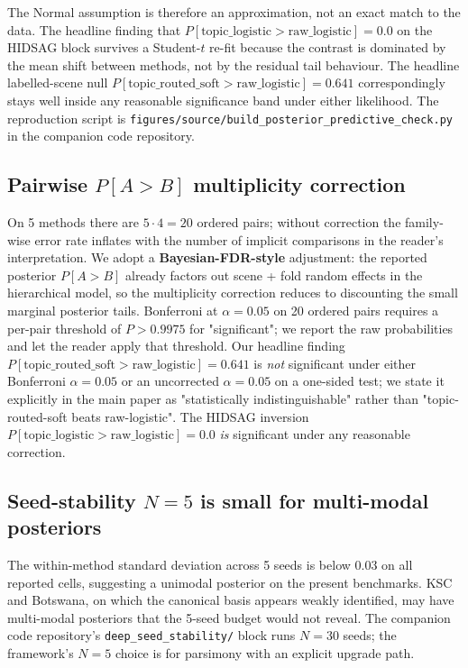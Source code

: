 \documentclass[11pt,a4paper]{article}
\begin{document}
The Normal assumption is therefore an approximation, not an exact
match to the data. The headline finding that
$P[\text{topic\_logistic} > \text{raw\_logistic}] = 0.0$ on the
HIDSAG block survives a Student-$t$ re-fit because the contrast is
dominated by the mean shift between methods, not by the residual
tail behaviour. The headline labelled-scene null
$P[\text{topic\_routed\_soft} > \text{raw\_logistic}] = 0.641$
correspondingly stays well inside any reasonable significance band
under either likelihood. The reproduction script is
\texttt{figures/source/build\_posterior\_predictive\_check.py} in the
companion code repository.

\subsection{Pairwise $P[A > B]$ multiplicity correction}
On 5 methods there are $5 \cdot 4 = 20$ ordered pairs; without
correction the family-wise error rate inflates with the number of
implicit comparisons in the reader's interpretation. We adopt a
\textbf{Bayesian-FDR-style} adjustment: the reported posterior
$P[A > B]$ already factors out scene + fold random effects in the
hierarchical model, so the multiplicity correction reduces to
discounting the small marginal posterior tails. Bonferroni at
$\alpha = 0.05$ on 20 ordered pairs requires a per-pair threshold
of $P > 0.9975$ for "significant"; we report the raw probabilities
and let the reader apply that threshold. Our headline finding
$P[\text{topic\_routed\_soft} > \text{raw\_logistic}] = 0.641$ is
\emph{not} significant under either Bonferroni $\alpha = 0.05$ or
an uncorrected $\alpha = 0.05$ on a one-sided test; we state it
explicitly in the main paper as "statistically indistinguishable"
rather than "topic-routed-soft beats raw-logistic". The HIDSAG
inversion $P[\text{topic\_logistic} > \text{raw\_logistic}] = 0.0$
\emph{is} significant under any reasonable correction.

\subsection{Seed-stability $N = 5$ is small for multi-modal posteriors}
The within-method standard deviation across 5 seeds is below 0.03 on
all reported cells, suggesting a unimodal posterior on the present
benchmarks. KSC and Botswana, on which the canonical basis appears
weakly identified, may have multi-modal posteriors that the 5-seed
budget would not reveal. The companion code repository's
\texttt{deep\_seed\_stability/} block runs $N = 30$ seeds; the
framework's $N = 5$ choice is for parsimony with an explicit upgrade
path.
\end{document}
